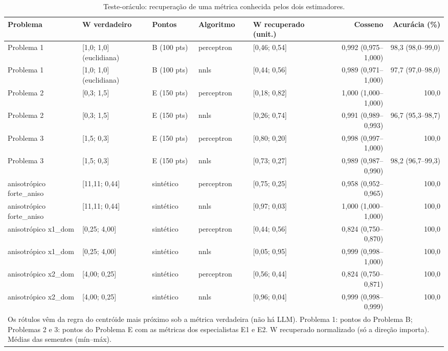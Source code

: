 \begin{table}[htbp]
\centering
\small
\caption{Teste-oráculo: recuperação de uma métrica conhecida pelos dois estimadores.}
\label{tab:bloco1_oraculo_recuperacao_W}
\begin{tabular}{lllllrr}
\toprule
Problema & W verdadeiro & Pontos & Algoritmo & W recuperado (unit.) & Cosseno & Acurácia (\%) \\
\midrule
Problema 1 & [1,0; 1,0] (euclidiana) & B (100 pts) & perceptron & [0,46; 0,54] & 0,992 (0,975–1,000) & 98,3 (98,0–99,0) \\
Problema 1 & [1,0; 1,0] (euclidiana) & B (100 pts) & nnls & [0,44; 0,56] & 0,989 (0,971–1,000) & 97,7 (97,0–98,0) \\
\midrule
Problema 2 & [0,3; 1,5] & E (150 pts) & perceptron & [0,18; 0,82] & 1,000 (1,000–1,000) & 100,0 \\
Problema 2 & [0,3; 1,5] & E (150 pts) & nnls & [0,26; 0,74] & 0,991 (0,989–0,993) & 96,7 (95,3–98,7) \\
\midrule
Problema 3 & [1,5; 0,3] & E (150 pts) & perceptron & [0,80; 0,20] & 0,998 (0,997–1,000) & 100,0 \\
Problema 3 & [1,5; 0,3] & E (150 pts) & nnls & [0,73; 0,27] & 0,989 (0,987–0,990) & 98,2 (96,7–99,3) \\
\midrule
anisotrópico forte\_aniso & [11,11; 0,44] & sintético & perceptron & [0,75; 0,25] & 0,958 (0,952–0,965) & 100,0 \\
anisotrópico forte\_aniso & [11,11; 0,44] & sintético & nnls & [0,97; 0,03] & 1,000 (1,000–1,000) & 100,0 \\
\midrule
anisotrópico x1\_dom & [0,25; 4,00] & sintético & perceptron & [0,44; 0,56] & 0,824 (0,750–0,870) & 100,0 \\
anisotrópico x1\_dom & [0,25; 4,00] & sintético & nnls & [0,05; 0,95] & 0,999 (0,998–1,000) & 100,0 \\
\midrule
anisotrópico x2\_dom & [4,00; 0,25] & sintético & perceptron & [0,56; 0,44] & 0,824 (0,750–0,871) & 100,0 \\
anisotrópico x2\_dom & [4,00; 0,25] & sintético & nnls & [0,96; 0,04] & 0,999 (0,998–0,999) & 100,0 \\
\bottomrule
\multicolumn{7}{p{0.95\linewidth}}{\footnotesize Os rótulos vêm da regra do centróide mais próximo sob a métrica verdadeira (não há LLM). Problema 1: pontos do Problema B; Problemas 2 e 3: pontos do Problema E com as métricas dos especialistas E1 e E2. W recuperado normalizado (só a direção importa). Médias das sementes (mín–máx).} \\
\end{tabular}
\end{table}
